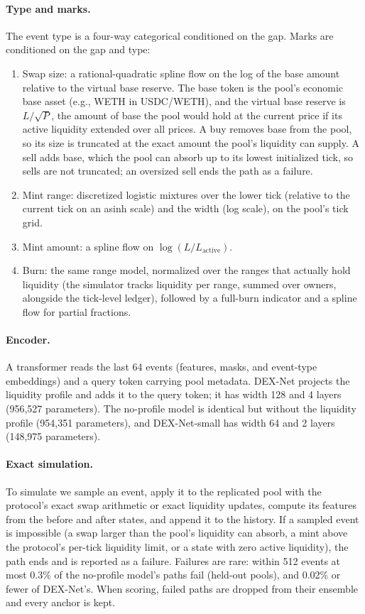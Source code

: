 \documentclass[11pt]{article}
\begin{document}
\paragraph{Type and marks.} The event type is a four-way categorical conditioned on the gap. Marks are conditioned on the gap and type:

\begin{enumerate}
\item Swap size: a rational-quadratic spline flow \citep{durkan2019spline} on the log of the base amount relative to the virtual base reserve. The base token is the pool's economic base asset (e.g., WETH in USDC/WETH), and the virtual base reserve is $L/\sqrt{P}$, the amount of base the pool would hold at the current price if its active liquidity extended over all prices. A buy removes base from the pool, so its size is truncated at the exact amount the pool's liquidity can supply. A sell adds base, which the pool can absorb up to its lowest initialized tick, so sells are not truncated; an oversized sell ends the path as a failure.
\item Mint range: discretized logistic mixtures over the lower tick (relative to the current tick on an asinh scale) and the width (log scale), on the pool's tick grid.
\item Mint amount: a spline flow on $\log(L/L_{\mathrm{active}})$.
\item Burn: the same range model, normalized over the ranges that actually hold liquidity (the simulator tracks liquidity per range, summed over owners, alongside the tick-level ledger), followed by a full-burn indicator and a spline flow for partial fractions.
\end{enumerate}

\paragraph{Encoder.} A transformer reads the last 64 events (features, masks, and event-type embeddings) and a query token carrying pool metadata. DEX-Net projects the liquidity profile and adds it to the query token; it has width 128 and 4 layers (956,527 parameters). The no-profile model is identical but without the liquidity profile (954,351 parameters), and DEX-Net-small has width 64 and 2 layers (148,975 parameters).

\paragraph{Exact simulation.} To simulate we sample an event, apply it to the replicated pool with the protocol's exact swap arithmetic \citep{adams2021uniswap} or exact liquidity updates, compute its features from the before and after states, and append it to the history. If a sampled event is impossible (a swap larger than the pool's liquidity can absorb, a mint above the protocol's per-tick liquidity limit, or a state with zero active liquidity), the path ends and is reported as a failure. Failures are rare: within 512 events at most 0.3\% of the no-profile model's paths fail (held-out pools), and 0.02\% or fewer of DEX-Net's. When scoring, failed paths are dropped from their ensemble and every anchor is kept.
\end{document}
